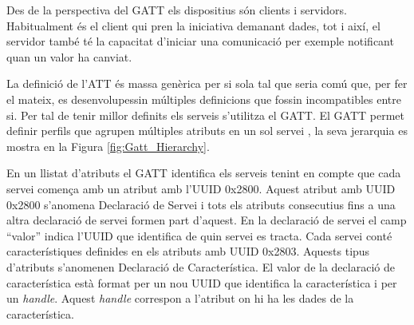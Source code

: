 Des de la perspectiva del GATT els dispositius són clients i servidors.
Habitualment és el client qui pren la iniciativa demanant dades, tot i així, el servidor també té la capacitat d'iniciar una comunicació per exemple notificant quan un valor ha canviat.

La definició de l'ATT és massa genèrica per si sola tal que seria comú que, per fer el mateix, es desenvolupessin múltiples definicions que fossin incompatibles entre si.
Per tal de tenir millor definits els serveis s'utilitza el GATT.
El GATT permet definir perfils que agrupen múltiples atributs en un sol servei \cite{services}, la seva jerarquia es mostra en la Figura \ref{fig:Gatt_Hierarchy}.

En un llistat d'atributs el GATT identifica els serveis tenint en compte que cada servei comença amb un atribut amb l'UUID 0x2800.
Aquest atribut amb UUID 0x2800 s'anomena Declaració de Servei i tots els atributs consecutius fins a una altra declaració de servei formen part d'aquest.
En la declaració de servei el camp ``valor'' indica l'UUID que identifica de quin servei es tracta.
Cada servei conté característiques \cite{characteristics} definides en els atributs amb UUID 0x2803.
Aquests tipus d'atributs s'anomenen Declaració de Característica.
El valor de la declaració de característica està format per un nou UUID que identifica la característica i per un \textit{handle}.
Aquest \textit{handle} correspon a l'atribut on hi ha les dades de la característica.

